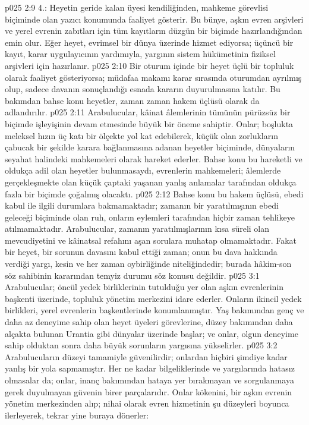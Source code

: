 \vs p025 2:9 4.\bibnobreakspace {}: Heyetin geride kalan üyesi kendiliğinden, mahkeme görevlisi biçiminde olan yazıcı konumunda faaliyet gösterir. Bu bünye, aşkın evren arşivleri ve yerel evrenin zabıtları için tüm kayıtların düzgün bir biçimde hazırlandığından emin olur. Eğer heyet, evrimsel bir dünya üzerinde hizmet ediyorsa; üçüncü bir kayıt, karar uygulayıcının yardımıyla, yargının sistem hükümetinin fiziksel arşivleri için hazırlanır.
\vs p025 2:10 Bir oturum içinde bir heyet üçlü bir topluluk olarak faaliyet gösteriyorsa; müdafaa makamı karar sırasında oturumdan ayrılmış olup, sadece davanın sonuçlandığı esnada kararın duyurulmasına katılır. Bu bakımdan bahse konu heyetler, zaman zaman hakem üçlüsü olarak da adlandırılır.
\vs p025 2:11 Arabulucular, kâinat âlemlerinin tümünün pürüzsüz bir biçimde işleyişinin devam etmesinde büyük bir öneme sahiptir. Onlar; boşlukta meleksel hızın üç katı bir ölçekte yol kat edebilerek, küçük olan zorlukların çabucak bir şekilde karara bağlanmasına adanan heyetler biçiminde, dünyaların seyahat halindeki mahkemeleri olarak hareket ederler. Bahse konu bu hareketli ve oldukça adil olan heyetler bulunmasaydı, evrenlerin mahkemeleri; âlemlerde gerçekleşmekte olan küçük çaptaki yaşanan yanlış anlamalar tarafından oldukça fazla bir biçimde çoğalmış olacaktı.
\vs p025 2:12 Bahse konu bu hakem üçlüsü, ebedi kabul ile ilgili durumlara bakmamaktadır; zamanın bir yaratılmışının ebedi geleceği biçiminde olan ruh, onların eylemleri tarafından hiçbir zaman tehlikeye atılmamaktadır. Arabulucular, zamanın yaratılmışlarının kısa süreli olan mevcudiyetini ve kâinatsal refahını aşan sorulara muhatap olmamaktadır. Fakat bir heyet, bir sorunun davasını kabul ettiği zaman; onun bu dava hakkında verdiği yargı, kesin ve her zaman oybirliğinde niteliğindedir; burada hâkim\hyp{}son söz sahibinin kararından temyiz durumu söz konusu değildir.
\vs p025 3:1 Arabulucular; öncül yedek birliklerinin tutulduğu yer olan aşkın evrenlerinin başkenti üzerinde, topluluk yönetim merkezini idare ederler. Onların ikincil yedek birlikleri, yerel evrenlerin başkentlerinde konumlanmıştır. Yaş bakımından genç ve daha az deneyime sahip olan heyet üyeleri görevlerine, düzey bakımından daha alçakta bulunan Urantia gibi dünyalar üzerinde başlar; ve onlar, olgun deneyime sahip olduktan sonra daha büyük sorunların yargısına yükselirler.
\vs p025 3:2 Arabulucuların düzeyi tamamiyle güvenilirdir; onlardan hiçbiri şimdiye kadar yanlış bir yola sapmamıştır. Her ne kadar bilgeliklerinde ve yargılarında hatasız olmasalar da; onlar, inanç bakımından hataya yer bırakmayan ve sorgulanmaya gerek duyulmayan güvenin birer parçalarıdır. Onlar kökenini, bir aşkın evrenin yönetim merkezinden alıp; nihai olarak evren hizmetinin şu düzeyleri boyunca ilerleyerek, tekrar yine buraya dönerler:
